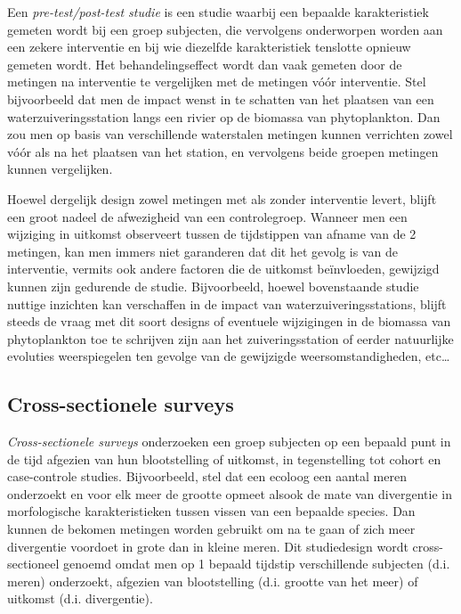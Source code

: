 \documentclass[
  12pt,dutch]{book}
\theoremstyle{definition}
\theoremstyle{definition}
\theoremstyle{definition}
\theoremstyle{definition}
\theoremstyle{remark}
\begin{document}
Een \emph{pre-test/post-test studie} is een studie waarbij een bepaalde
karakteristiek gemeten wordt bij een groep subjecten, die vervolgens
onderworpen worden aan een zekere interventie en bij wie diezelfde
karakteristiek tenslotte opnieuw gemeten wordt. Het behandelingseffect wordt
dan vaak gemeten door de metingen na interventie te vergelijken met de
metingen vóór interventie.
Stel bijvoorbeeld dat men de impact wenst in te schatten van het plaatsen van een waterzuiveringsstation langs een rivier op de biomassa van phytoplankton. Dan zou men op basis van verschillende waterstalen metingen kunnen verrichten zowel vóór als na het plaatsen van het station, en vervolgens beide groepen metingen kunnen vergelijken.

Hoewel dergelijk design zowel metingen met als zonder interventie levert,
blijft een groot nadeel de afwezigheid van een controlegroep. Wanneer men
een wijziging in uitkomst observeert tussen de tijdstippen van afname van de
2 metingen, kan men immers niet garanderen dat dit het gevolg is van de
interventie, vermits ook andere factoren die de uitkomst beïnvloeden,
gewijzigd kunnen zijn gedurende de studie. Bijvoorbeeld, hoewel bovenstaande studie nuttige inzichten kan verschaffen in de impact van waterzuiveringsstations, blijft steeds de vraag met dit soort designs of eventuele wijzigingen in de biomassa van phytoplankton toe te schrijven zijn aan het zuiveringsstation of eerder natuurlijke evoluties weerspiegelen ten gevolge van de gewijzigde weersomstandigheden, etc\ldots{}

\subsection{Cross-sectionele surveys}\label{cross-sectionele-surveys}

\emph{Cross-sectionele surveys} onderzoeken een groep subjecten op een
bepaald punt in de tijd afgezien van hun blootstelling of uitkomst, in
tegenstelling tot cohort en case-controle studies. Bijvoorbeeld, stel dat een ecoloog een aantal meren onderzoekt en voor elk meer de grootte opmeet alsook de mate van divergentie in morfologische karakteristieken tussen vissen van een bepaalde species.
Dan kunnen de bekomen metingen worden gebruikt om na te gaan of zich meer divergentie voordoet in grote dan in kleine meren. Dit studiedesign wordt cross-sectioneel genoemd omdat men op 1 bepaald tijdstip verschillende subjecten (d.i. meren) onderzoekt, afgezien van blootstelling (d.i. grootte van het meer) of uitkomst (d.i. divergentie).
\end{document}
